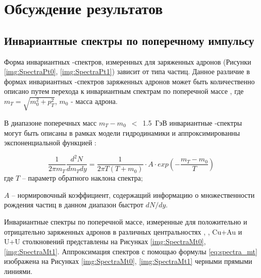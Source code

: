 \chapter{Обсуждение результатов} \label{chapt5}

\section{Инвариантные спектры по поперечному импульсу} \label{sect5_spectra}

Форма инвариантных \pt-спектров, измеренных для заряженных адронов (Рисунки \ref{img:SpectraPt0}, \ref{img:SpectraPt1}) зависит от типа частиц.
Данное различие в формах инвариантных \pt-спектров заряженных адронов может быть количественно описано путем перехода к инвариантным спектрам по поперечной массе \mt, где $m_T = \sqrt{m_{0}^{2} + p_{T}^{2}}$, $m_0$ - масса адрона. 

В диапазоне поперечных масс $m_T-m_0$~$<$~1.5~ГэВ инвариантные \mt-спектры могут быть описаны в рамках модели гидродинамики \cite{PPG026, HydroPartonicCascade} и аппроксимированны экспоненциальной функцией \cite{ToutModels}:

\begin{equation}
	\label{eq:spectra_mt}
	\frac{1}{2\pi m_T} \frac{d^2 N}{dm_T dy}=\frac{1}{2\pi T (T+m_0)}\cdot A \cdot exp \left( -\frac{m_T - m_0}{T}\right)
\end{equation}
где $T$ -- параметр обратного наклона спектра;

$A$ -- нормировочный коэффициент, содержащий информацию о множественности рождения частиц в данном диа­пазон быстрот $dN/dy$.

Инвариантные спектры по поперечной массе, измеренные для положительно и отрицательно заряженных адронов в различных центральностях \pal, \heau, Cu+Au и U+U столкновений представлены на Рисунках \ref{img:SpectraMt0}, \ref{img:SpectraMt1}. Аппроксимация спектров с помощью формулы \ref{eq:spectra_mt} изображена на Рисунках \ref{img:SpectraMt0}, \ref{img:SpectraMt1} черными прямыми линиями.

